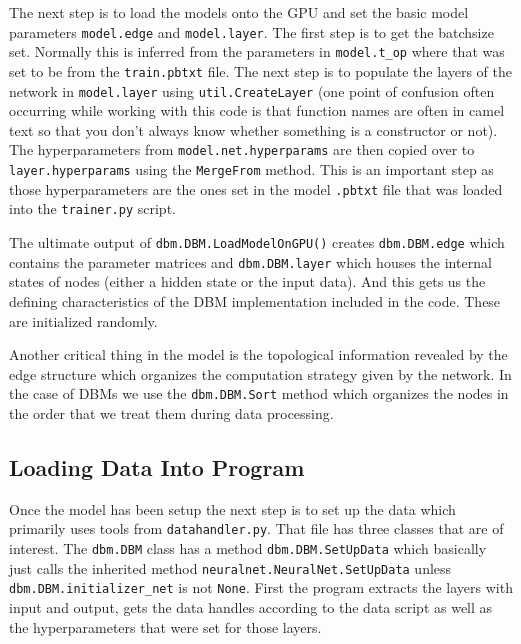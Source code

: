 \documentclass{article} %
\begin{document}
The next step is to load the models onto the GPU and set the basic model parameters
\texttt{model.edge} and \texttt{model.layer}.  The first step is to get the batchsize set. Normally this is inferred from the 
parameters in \texttt{model.t\_op} where that was set to be from the \texttt{train.pbtxt} file. The next step is to populate
the layers of the network in \texttt{model.layer} using \texttt{util.CreateLayer} (one point of confusion often occurring while
working with this code is that function names are often in camel text so that you don't always know whether something is a constructor
or not). The hyperparameters from \texttt{model.net.hyperparams} are then copied over to \texttt{layer.hyperparams} using 
the \texttt{MergeFrom} method.  This is an important step as those hyperparameters are the ones set in the model \texttt{.pbtxt}
file that was loaded into the \texttt{trainer.py} script.

The ultimate output of \texttt{dbm.DBM.LoadModelOnGPU()} creates \texttt{dbm.DBM.edge} which contains the parameter matrices
and \texttt{dbm.DBM.layer} which houses the internal states of nodes (either a hidden state or the input data). And this gets us the
defining characteristics of the DBM implementation included in the code.  These are initialized randomly.

Another critical thing in the model is the topological information revealed by the edge structure which organizes
the computation strategy given by the network.  In the case of DBMs we use the \texttt{dbm.DBM.Sort} method which organizes
the nodes in the order that we treat them during data processing.

\subsection{Loading Data Into Program}

Once the model has been setup the next step is to set up the data which primarily uses tools from \texttt{datahandler.py}.
That file has three classes that are of interest.  The \texttt{dbm.DBM} class has a method \texttt{dbm.DBM.SetUpData} which
basically just calls the inherited method \texttt{neuralnet.NeuralNet.SetUpData} unless \texttt{dbm.DBM.initializer\_net} is not
\texttt{None}.  First the program extracts the layers with input and output, gets the data handles according to the data
script as well as the hyperparameters that were set for those layers.
\end{document}
